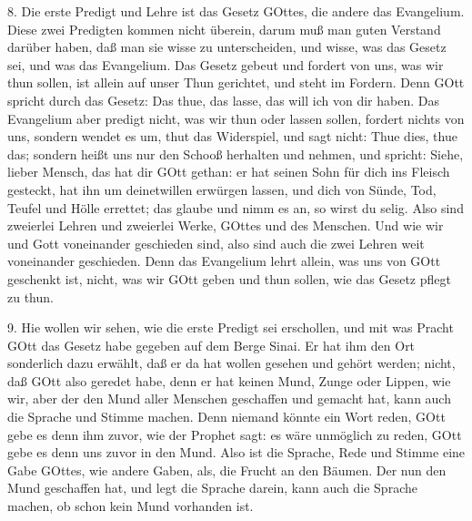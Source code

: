 8. Die erste Predigt und Lehre ist das Gesetz GOttes, die andere das Evangelium. Diese zwei Predigten kommen nicht überein, darum muß man guten Verstand darüber haben, daß man sie wisse zu unterscheiden, und wisse, was das Gesetz sei, und was das Evangelium. Das Gesetz gebeut und fordert von uns, was wir thun sollen, ist allein auf unser Thun gerichtet, und steht im Fordern. Denn GOtt spricht durch das Gesetz: Das thue, das lasse, das will ich von dir haben. Das Evangelium aber predigt nicht, was wir thun oder lassen sollen, fordert nichts von uns, sondern wendet es um, thut das Widerspiel, und sagt nicht: Thue dies, thue das; sondern heißt uns nur den Schooß herhalten und nehmen, und spricht: Siehe, lieber Mensch,
das hat dir GOtt gethan: er hat seinen Sohn für dich ins Fleisch gesteckt, hat ihn um deinetwillen erwürgen lassen, und dich von Sünde, Tod, Teufel und Hölle errettet; das glaube und nimm es an, so wirst du selig. Also sind zweierlei Lehren und zweierlei Werke, GOttes und des Menschen. Und wie wir und Gott voneinander geschieden sind, also sind auch die zwei Lehren weit voneinander geschieden. Denn das Evangelium lehrt allein, was uns von GOtt geschenkt ist, nicht, was wir GOtt geben und thun sollen, wie das Gesetz pflegt zu thun.

9. Hie wollen wir sehen, wie die erste Predigt sei erschollen, und mit was Pracht GOtt das Gesetz habe gegeben auf dem Berge Sinai. Er hat ihm den Ort sonderlich dazu erwählt, daß er da hat wollen gesehen und gehört werden; nicht, daß GOtt also geredet habe, denn er hat keinen Mund, Zunge oder Lippen, wie wir, aber der den Mund aller Menschen geschaffen und gemacht hat, kann auch die Sprache und Stimme machen. Denn niemand könnte ein Wort reden, GOtt gebe es denn ihm zuvor, wie der Prophet sagt: es wäre unmöglich zu reden, GOtt gebe es denn uns zuvor in den Mund. Also ist die Sprache, Rede und Stimme eine Gabe GOttes, wie andere Gaben, als, die Frucht an den Bäumen. Der nun den Mund geschaffen hat, und legt die Sprache darein, kann auch die Sprache machen, ob schon kein Mund vorhanden ist.

